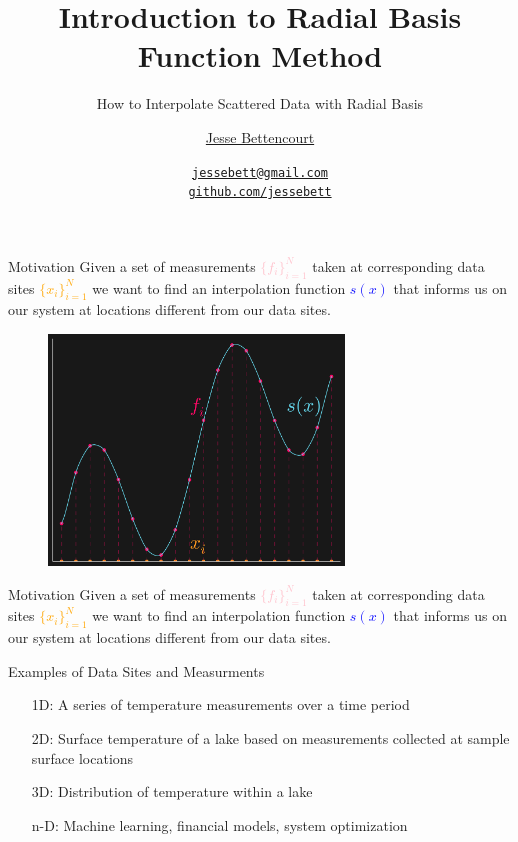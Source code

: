 \documentclass[12pt,t]{beamer}
\title{Introduction to Radial Basis Function Method}
\subtitle{How to Interpolate Scattered Data with Radial Basis}
\author{\href{https://github.com/jessebett/}{Jesse Bettencourt}}
\institute{McMaster University\\Dr. Kevlahan}
\date{\href{jessebett@gmail.com}{\tt \scriptsize jessebett@gmail.com}
\\[-4pt]
\href{http://github.com/jessebett}{\tt \scriptsize github.com/jessebett}
}
\newcommand{\subt}[1]{{\footnotesize \color{subtitle} {#1}}}
\begin{document}
\begin{frame}
  \titlepage
  \note{}
\end{frame}

\begin{frame}{Motivation}
Given a set of measurements \textcolor{pink}{$\{f_i\}_{i=1}^N$}
taken at corresponding data sites \textcolor{orange}{$\{x_i\}_{i=1}^N$}
we want to find an interpolation function \textcolor{blue}{$s(x)$}
that informs us on our system at locations different from our data sites.\\
\bigskip 

\begin{figure}
\includegraphics[width=0.7\textwidth, keepaspectratio]{interpdef.png}
\end{figure}

\note{}
\end{frame}
\begin{frame}{Motivation}
Given a set of measurements \textcolor{pink}{$\{f_i\}_{i=1}^N$}
taken at corresponding data sites \textcolor{orange}{$\{x_i\}_{i=1}^N$}
we want to find an interpolation function \textcolor{blue}{$s(x)$}
that informs us on our system at locations different from our data sites.\\
\bigskip 

\subt{Examples of Data Sites and Measurments}
\begin{itemize}
\item[1D:] A series of temperature measurements over a time period
\item[2D:] Surface temperature of a lake based on measurements collected at sample surface locations 
\item[3D:] Distribution of temperature within a lake
\item[n-D:] Machine learning, financial models, system optimization
\end{itemize}

\note{}
\end{frame}
\end{document}
